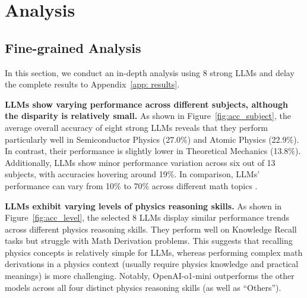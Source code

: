 

\section{Analysis}\label{sec:analysis}
\subsection{Fine-grained Analysis}\label{sec: more_results}




In this section, we conduct an in-depth analysis using 8 strong LLMs and delay the complete results to Appendix~\ref{app: results}.


\textbf{LLMs show varying performance across different subjects, although the disparity is relatively small.} 
As shown in Figure~\ref{fig:acc_subject}, the average overall accuracy of eight strong LLMs reveals that they perform particularly well in Semiconductor Physics (27.0\%) and Atomic Physics (22.9\%). 
In contrast, their performance is slightly lower in Theoretical Mechanics (13.8\%). 
Additionally, LLMs show minor performance variation across six out of 13 subjects, with accuracies hovering around 19\%.
In comparison, LLMs' performance can vary from 10\% to 70\% across different math topics \citep{MathBench2024Liu}.


\textbf{LLMs exhibit varying levels of physics reasoning skills.}
As shown in Figure~\ref{fig:acc_level}, the selected 8 LLMs display similar performance trends across different physics reasoning skills.
They perform well on Knowledge Recall tasks but struggle with Math Derivation problems.
This suggests that recalling physics concepts is relatively simple for LLMs, whereas performing complex math derivations in a physics context (usually require physics knowledge and practical meanings) is more challenging.
Notably, OpenAI-o1-mini outperforms the other models across all four distinct physics reasoning skills (as well as ``Others'').


